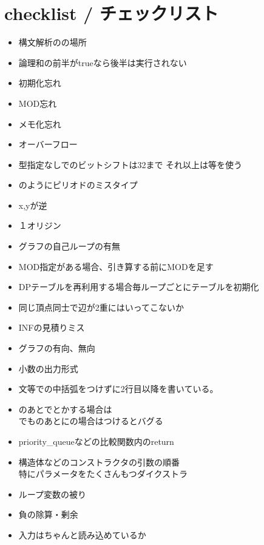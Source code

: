 \section{checklist / チェックリスト}
\begin{itemize}
\item 構文解析のの場所
\item 論理和\code{||}の前半がtrueなら後半は実行されない
\item 初期化忘れ
\item MOD忘れ
\item メモ化忘れ
\item オーバーフロー
\item 型指定なしでのビットシフトは32まで それ以上は等を使う
\item {}のようにピリオドのミスタイプ
\item x,yが逆
\item １オリジン
\item グラフの自己ループの有無
\item MOD指定がある場合、引き算する前にMODを足す 
\item DPテーブルを再利用する場合毎ループごとにテーブルを初期化
\item 同じ頂点同士で辺が2重にはいってこないか
\item INFの見積りミス
\item グラフの有向、無向
\item 小数の出力形式
\item {}文等での中括弧をつけずに2行目以降を書いている。
\item {}のあとでとかする場合は\\でものあとにの場合はつけるとバグる
\item priority\_queueなどの比較関数内のreturn
\item 構造体などのコンストラクタの引数の順番\\特にパラメータをたくさんもつダイクストラ
\item ループ変数の被り
\item 負の除算・剰余
\item 入力はちゃんと読み込めているか
\end{itemize}
